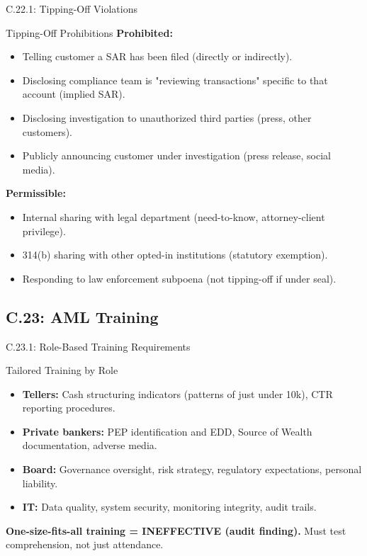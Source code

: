 \documentclass{beamer}
\begin{document}
	\begin{frame}{C.22.1: Tipping-Off Violations}
		\begin{block}{Tipping-Off Prohibitions}
			\textbf{Prohibited:}
			\begin{itemize}
				\item Telling customer a SAR has been filed (directly or indirectly).
				\item Disclosing compliance team is "reviewing transactions" specific to that account (implied SAR).
				\item Disclosing investigation to unauthorized third parties (press, other customers).
				\item Publicly announcing customer under investigation (press release, social media).
			\end{itemize}
		\end{block}
		\textbf{Permissible:}
		\begin{itemize}
			\item Internal sharing with legal department (need-to-know, attorney-client privilege).
			\item 314(b) sharing with other opted-in institutions (statutory exemption).
			\item Responding to law enforcement subpoena (not tipping-off if under seal).
		\end{itemize}
	\end{frame}
	
	\subsection{C.23: AML Training}
	
	\begin{frame}{C.23.1: Role-Based Training Requirements}
		\begin{block}{Tailored Training by Role}
			\begin{itemize}
				\item \textbf{Tellers:} Cash structuring indicators (patterns of just under 10k), CTR reporting procedures.
				\item \textbf{Private bankers:} PEP identification and EDD, Source of Wealth documentation, adverse media.
				\item \textbf{Board:} Governance oversight, risk strategy, regulatory expectations, personal liability.
				\item \textbf{IT:} Data quality, system security, monitoring integrity, audit trails.
			\end{itemize}
		\end{block}
		\textbf{ One-size-fits-all training = INEFFECTIVE (audit finding).} Must test comprehension, not just attendance.
	\end{frame}
	
\end{document}

